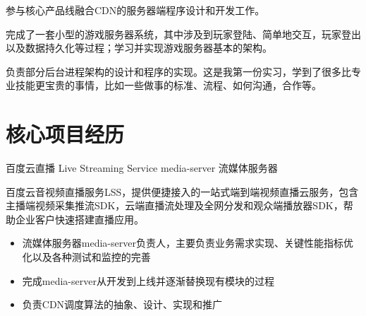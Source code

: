 \documentclass[11pt,a4paper]{moderncv}
\begin{document}
{
参与核心产品线融合CDN的服务器端程序设计和开发工作。
}
\vspace*{0.4\baselineskip}

{
完成了一套小型的游戏服务器系统，其中涉及到玩家登陆、简单地交互，玩家登出以及数据持久化等过程；学习并实现游戏服务器基本的架构。
}
\vspace*{0.4\baselineskip}


{
负责部分后台进程架构的设计和程序的实现。这是我第一份实习，学到了很多比专业技能更宝贵的事情，比如一些做事的标准、流程、如何沟通，合作等。
}


\section{核心项目经历}

{百度云直播}
{Live Streaming Service}
{media-server}
{流媒体服务器}
{
百度云音视频直播服务LSS，提供便捷接入的一站式端到端视频直播云服务，包含主播端视频采集推流SDK，云端直播流处理及全网分发和观众端播放器SDK，帮助企业客户快速搭建直播应用。
\begin{itemize}
    \item 流媒体服务器media-server负责人，主要负责业务需求实现、关键性能指标优化以及各种测试和监控的完善
    \item 完成media-server从开发到上线并逐渐替换现有模块的过程
    \item 负责CDN调度算法的抽象、设计、实现和推广
\end{itemize}
}
\vspace*{0.4\baselineskip}
\end{document}
